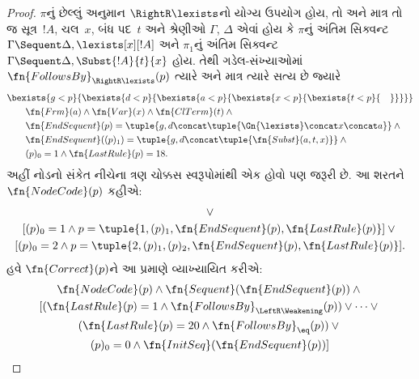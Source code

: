 \begin{proof}
$\pi$નું છેલ્લું અનુમાન
$\RightR\lexists$નો યોગ્ય ઉપયોગ હોય,
તો અને માત્ર તો જ સૂત્ર~$!A$,
ચલ~$x$, બંધ પદ~$t$ અને શ્રેણીઓ
$\Gamma$, $\Delta$ એવાં હોય કે
$\pi$નું અંતિમ સિક્વન્ટ
$\Gamma \Sequent \Delta, \lexists[x][!A]$
અને $\pi_1$નું અંતિમ સિક્વન્ટ
$\Gamma \Sequent \Delta,
\Subst{!A}{t}{x}$ હોય. તેથી
ગડેલ-સંખ્યાઓમાં
$\fn{FollowsBy}_{\RightR\lexists}(p)$
ત્યારે અને માત્ર ત્યારે સત્ય છે જ્યારે
\begin{align*}
  & \bexists{g<p}{\bexists{d<p}{\bexists{a<p}{\bexists{x<p}{\bexists{t<p}{\quad}}}}}\\
  & \qquad \fn{Frm}(a) \land \fn{Var}(x) \land \fn{ClTerm}(t) \land {}\\
  & \qquad \fn{EndSequent}(p) = 
  \tuple{
    g,
    d \concat \tuple{\Gn{\lexists} \concat x \concat a}
  } \land {}\\
  & \qquad \fn{EndSequent}((p)_1) = 
  \tuple{
    g,
    d \concat \tuple{\fn{Subst}(a, t, x)}
  } \land {}\\
  & \qquad (p)_0 = 1 \land \fn{LastRule}(p) = 18.
\end{align*}
અહીં નોડનો સંકેત નીચેના ત્રણ ચોક્કસ સ્વરૂપોમાંથી
એક હોવો પણ જરૂરી છે. આ શરતને
$\fn{NodeCode}(p)$ કહીએ:
\begin{multline*}
[(p)_0=0 \land p=\tuple{0,\fn{EndSequent}(p)}] \lor {}\\
[(p)_0=1 \land p=\tuple{1,(p)_1,\fn{EndSequent}(p),\fn{LastRule}(p)}] \lor {}\\
[(p)_0=2 \land p=\tuple{2,(p)_1,(p)_2,\fn{EndSequent}(p),\fn{LastRule}(p)}].
\end{multline*}
હવે $\fn{Correct}(p)$ને આ પ્રમાણે
વ્યાખ્યાયિત કરીએ:
\begin{multline*}
  \fn{NodeCode}(p) \land \fn{Sequent}(\fn{EndSequent}(p)) \land {}\\ 
  [(\fn{LastRule}(p) = 1 \land 
  \fn{FollowsBy}_{\LeftR\Weakening}(p)) \lor \dots \lor {}\\
  (\fn{LastRule}(p) = 20 \land \fn{FollowsBy}_{\eq}(p)) \lor {}\\
  (p)_0 = 0 \land \fn{InitSeq}(\fn{EndSequent}(p))]
\end{multline*}

\end{proof}
